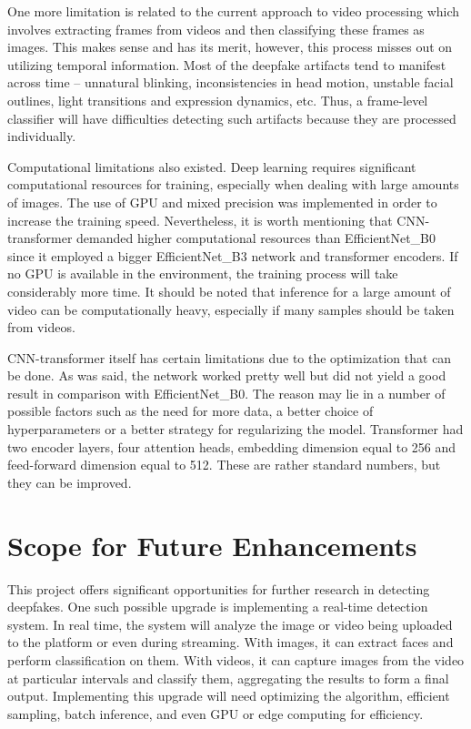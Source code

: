 \documentclass[12pt,a4paper]{report}
\begin{document}
One more limitation is related to the current approach to video processing which involves extracting frames from videos and then classifying these frames as images. This makes sense and has its merit, however, this process misses out on utilizing temporal information. Most of the deepfake artifacts tend to manifest across time – unnatural blinking, inconsistencies in head motion, unstable facial outlines, light transitions and expression dynamics, etc. Thus, a frame-level classifier will have difficulties detecting such artifacts because they are processed individually.

Computational limitations also existed. Deep learning requires significant computational resources for training, especially when dealing with large amounts of images. The use of GPU and mixed precision was implemented in order to increase the training speed. Nevertheless, it is worth mentioning that CNN-transformer demanded higher computational resources than EfficientNet\_B0 since it employed a bigger EfficientNet\_B3 network and transformer encoders. If no GPU is available in the environment, the training process will take considerably more time. It should be noted that inference for a large amount of video can be computationally heavy, especially if many samples should be taken from videos.

CNN-transformer itself has certain limitations due to the optimization that can be done. As was said, the network worked pretty well but did not yield a good result in comparison with EfficientNet\_B0. The reason may lie in a number of possible factors such as the need for more data, a better choice of hyperparameters or a better strategy for regularizing the model. Transformer had two encoder layers, four attention heads, embedding dimension equal to 256 and feed-forward dimension equal to 512. These are rather standard numbers, but they can be improved.
\section{Scope for Future Enhancements}

This project offers significant opportunities for further research in detecting deepfakes. One such possible upgrade is implementing a real-time detection system. In real time, the system will analyze the image or video being uploaded to the platform or even during streaming. With images, it can extract faces and perform classification on them. With videos, it can capture images from the video at particular intervals and classify them, aggregating the results to form a final output. Implementing this upgrade will need optimizing the algorithm, efficient sampling, batch inference, and even GPU or edge computing for efficiency.
\end{document}
